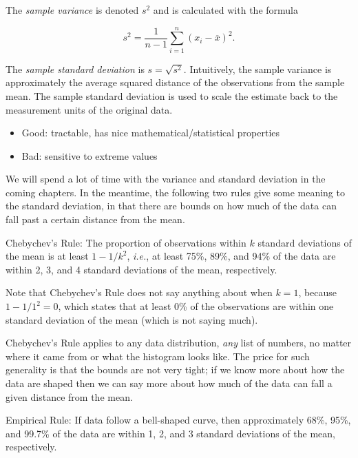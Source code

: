 \documentclass[captions=tableheading]{scrbook}
\begin{document}
The \emph{sample variance} is denoted \(s^{2}\) and is calculated with the formula

\begin{equation}
s^{2}=\frac{1}{n-1}\sum_{i=1}^{n}(x_{i}-\overline{x})^{2}.
\end{equation}

The \emph{sample standard deviation} is \(s=\sqrt{s^{2}}\). Intuitively, the sample variance is approximately the average squared distance of the observations from the sample mean. The sample standard deviation is used to scale the estimate back to the measurement units of the original data.

\begin{itemize}
\item Good: tractable, has nice mathematical/statistical properties
\item Bad: sensitive to extreme values
\end{itemize}

We will spend a lot of time with the variance and standard deviation in the coming chapters. In the meantime, the following two rules give some meaning to the standard deviation, in that there are bounds on how much of the data can fall past a certain distance from the mean.

\begin{fact}
Chebychev's Rule: The proportion of observations within \(k\) standard deviations of the mean is at least \(1-1/k^{2}\), \emph{i.e.}, at least 75\%, 89\%, and 94\% of the data are within 2, 3, and 4 standard deviations of the mean, respectively.
\end{fact}

Note that Chebychev's Rule does not say anything about when \(k=1\), because \(1-1/1^{2}=0\), which states that at least 0\% of the observations are within one standard deviation of the mean (which is not saying much).

Chebychev's Rule applies to any data distribution, \emph{any} list of numbers, no matter where it came from or what the histogram looks like. The price for such generality is that the bounds are not very tight; if we know more about how the data are shaped then we can say more about how much of the data can fall a given distance from the mean.

\begin{fact}
\label{fac:Empirical-Rule}Empirical Rule: If data follow a bell-shaped
curve, then approximately 68\%, 95\%, and 99.7\% of the data are within
1, 2, and 3 standard deviations of the mean, respectively. 
\end{fact}
\end{document}
